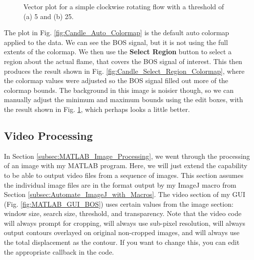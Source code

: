 \documentclass[letterpaper,12pt]{article}
\begin{document}
\begin{figure}[h]
\begin{subfigure}[b]{0.3\textwidth}
        \caption{}
        \label{fig:Candle_Edit_Region_Colormap}
    \end{subfigure}
 	
    \caption{Vector plot for a simple clockwise rotating flow with a threshold of (a) 5 and (b) 25.}
    \label{fig:Candle_Colormap}
\end{figure}

The plot in Fig. \ref{fig:Candle_Auto_Colormap} is the default auto colormap applied to the data.  We can see the BOS signal, but it is not using the full extents of the colormap.  We then use the \textcolor{myBlue}{\textbf{Select Region}} button to select a region about the actual flame, that covers the BOS signal of interest.  This then produces the result shown in Fig. \ref{fig:Candle_Select_Region_Colormap}, where the colormap values were adjusted so the BOS signal filled out more of the colormap bounds.  The background in this image is noisier though, so we can manually adjust the minimum and maximum bounds using the edit boxes, with the result shown in Fig. \ref{fig:Candle_Edit_Region_Colormap}, which perhaps looks a little better.

\subsection{Video Processing}
\label{subsec:MATLAB_Video_Processing}

In Section \ref{subsec:MATLAB_Image_Processing}, we went through the processing of an image with my MATLAB program.  Here, we will just extend the capability to be able to output video files from a sequence of images.  This section assumes the individual image files are in the format output by my ImageJ macro from Section \ref{subsec:Automate_ImageJ_with_Macros}.  The video section of my GUI (Fig. \ref{fig:MATLAB_GUI_BOS}) uses certain values from the image section: window size, search size, threshold, and transparency.  Note that the video code will always prompt for cropping, will always use sub-pixel resolution, will always output contours overlayed on original non-cropped images, and will always use the total displacement as the contour.  If you want to change this, you can edit the appropriate callback in the code.
\end{document}
